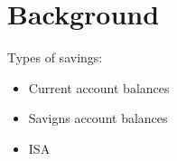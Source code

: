 
\section{Background}%
\label{sec:background}

Types of savings:

\begin{itemize}
    \item Current account balances
    \item Savigns account balances
    \item ISA
\end{itemize}



